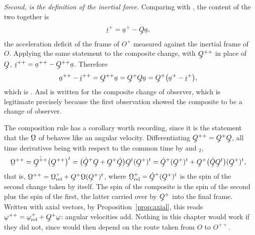 \emph{Second,  is the definition of the inertial force.}
Comparing  with , the content of the two together is
\[
   \vek{i}^{+}=\ba^{+}-\bQ\ba ,
\]
the acceleration deficit of the frame of $O^{+}$ measured against the
inertial frame of $O$. Applying the same statement to the composite
change, with $\bQ^{++}$ in place of $\bQ$,
$\vek{i}^{++}=\ba^{++}-\bQ^{++}\ba$. Therefore
\[
   \ba^{++}-\vek{i}^{++}=\bQ^{++}\ba=\bQ^{+}\bQ\ba
   =\bQ^{+}\big(\ba^{+}-\vek{i}^{+}\big),
\]
which is . And  is  written for the
composite change of observer, which is legitimate precisely because the
first observation showed the composite to be a change of observer.

\begin{remark}\label{rem:ch7addspin}
The composition rule has a corollary worth recording, since it is the
statement that the $\bOm$ of  behaves like an angular velocity.
Differentiating $\bQ^{++}=\bQ^{+}\bQ$, all time derivatives being with
respect to the common time by  and $_{2}$,
\[
   \bOm^{++}=\dot{\bQ^{++}}\big(\bQ^{++}\big)^{t}
   =\big(\dot\bQ^{+}\bQ+\bQ^{+}\dot\bQ\big)\bQ^{t}(\bQ^{+})^{t}
   =\dot\bQ^{+}(\bQ^{+})^{t}
     +\bQ^{+}\big(\dot\bQ\bQ^{t}\big)(\bQ^{+})^{t},
\]
that is, $\bOm^{++}=\bOm^{+}_{\text{rel}}+\bQ^{+}\bOm(\bQ^{+})^{t}$,
where $\bOm^{+}_{\text{rel}}=\dot\bQ^{+}(\bQ^{+})^{t}$ is the spin of the
second change taken by itself. The spin of the composite is the spin of
the second plus the spin of the first, the latter carried over by
$\bQ^{+}$ into the final frame. Written with axial vectors, by
Proposition~\ref{prop:axial}, this reads
$\bom^{++}=\bom^{+}_{\text{rel}}+\bQ^{+}\bom$: angular velocities add.
Nothing in this chapter would work if they did not, since 
would then depend on the route taken from $O$ to $O^{++}$.
\end{remark}

